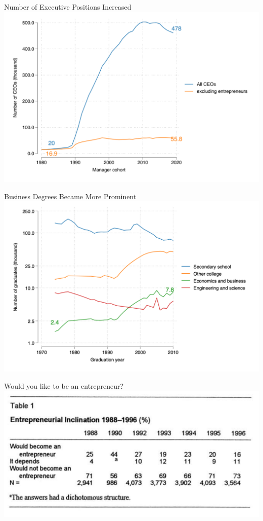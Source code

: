 \documentclass[
  ignorenonframetext,
  aspectratio=1610,
]{beamer}
\begin{document}
\begin{frame}{Number of Executive Positions Increased}
\protect\hypertarget{number-of-executive-positions-increased}{}
\includegraphics{fig/ceo-stock.png}
\end{frame}

\begin{frame}{Business Degrees Became More Prominent}
\protect\hypertarget{business-degrees-became-more-prominent}{}
\includegraphics{fig/school-graduates.png}
\end{frame}

\begin{frame}{Would you like to be an entrepreneur?}
\protect\hypertarget{would-you-like-to-be-an-entrepreneur}{}
\includegraphics{fig/lengyel1997.png}
\end{frame}
\end{document}

